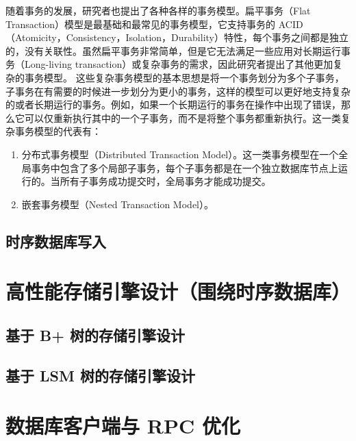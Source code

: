随着事务的发展，研究者也提出了各种各样的事务模型。扁平事务（Flat Transaction）模型是最基础和最常见的事务模型，它支持事务的 ACID（Atomicity，Consistency，Isolation，Durability）特性\cite{gray1981transaction}，每个事务之间都是独立的，没有关联性\cite{wang2005historic}。虽然扁平事务非常简单，但是它无法满足一些应用对长期运行事务（Long-living transaction）或复杂事务的需求，因此研究者提出了其他更加复杂的事务模型。
这些复杂事务模型的基本思想是将一个事务划分为多个子事务，子事务在有需要的时候进一步划分为更小的事务，这样的模型可以更好地支持复杂的或者长期运行的事务\cite{klas1992database}。例如，如果一个长期运行的事务在操作中出现了错误，那么它可以仅重新执行其中的一个子事务，而不是将整个事务都重新执行。这一类复杂事务模型的代表有：
\begin{enumerate}
  \item 分布式事务模型（Distributed Transaction Model）。这一类事务模型在一个全局事务中包含了多个局部子事务，每个子事务都是在一个独立数据库节点上运行的。当所有子事务成功提交时，全局事务才能成功提交\cite{breitbart2010overview}。
  \item 嵌套事务模型（Nested Transaction Model）。\cite{weikum1992concepts}
\end{enumerate}
\subsection{时序数据库写入}
\section{高性能存储引擎设计（围绕时序数据库）}
\subsection{基于 B+ 树的存储引擎设计}
\subsection{基于 LSM 树的存储引擎设计}
\section{数据库客户端与 RPC 优化}